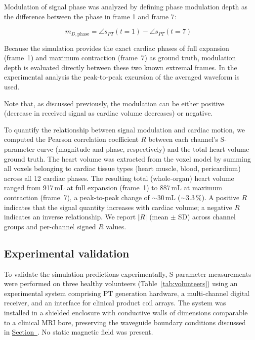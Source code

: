 \documentclass[
]{article}
\newcommand{\secref}[1]{\hyperref[#1]{Section~\nameref*{#1}}}
\begin{document}
Modulation of signal phase was analyzed by defining phase modulation
depth as the difference between the phase in frame 1 and frame 7:

\begin{equation}
\label{eq:mod-depth-phase}
m_{D,\mathrm{phase}} = \angle s_{PT}(t = 1) - \angle s_{PT}(t = 7)
\end{equation}

Because the simulation provides the exact cardiac phases of full expansion (frame~1) and maximum contraction (frame~7) as ground truth, modulation depth is evaluated directly between these two known extremal frames. In the experimental analysis the peak-to-peak excursion of the averaged waveform is used.

Note that, as discussed previously, the modulation can be either
positive (decrease in received signal as cardiac volume decreases) or
negative.

To quantify the relationship between signal modulation and cardiac motion, we computed the Pearson correlation coefficient $R$ between each channel's S-parameter curve (magnitude and phase, respectively) and the total heart volume ground truth. The heart volume was extracted from the voxel model by summing all voxels belonging to cardiac tissue types (heart muscle, blood, pericardium) across all 12 cardiac phases. The resulting total (whole-organ) heart volume ranged from 917\,mL at full expansion (frame~1) to 887\,mL at maximum contraction (frame~7), a peak-to-peak change of ${\sim}30$\,mL (${\sim}3.3\,\%$). A positive $R$ indicates that the signal quantity increases with cardiac volume; a negative $R$ indicates an inverse relationship. We report $|R|$ (mean $\pm$ SD) across channel groups and per-channel signed $R$ values.

\subsection{Experimental validation}

To validate the simulation predictions experimentally, S-parameter measurements were performed on three healthy volunteers (\mbox{Table~\ref{tab:volunteers}}) using an experimental system comprising PT generation hardware, a multi-channel digital receiver, and an interface for clinical product coil arrays. The system was installed in a shielded enclosure with conductive walls of dimensions comparable to a clinical MRI bore, preserving the waveguide boundary conditions discussed in \secref{theory}. No static magnetic field was present.
\end{document}
